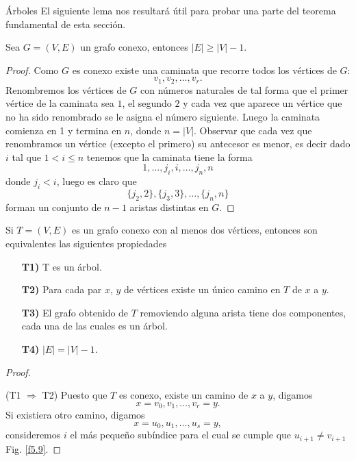 \begin{section}{Árboles}
El siguiente lema nos resultará útil para probar una parte del teorema fundamental de esta sección.

\begin{lema}\label{conv} Sea $G=(V,E)$ un grafo conexo, entonces $|E| \ge |V| -1$.  
\end{lema}
\begin{proof} Como $G$ es conexo existe una caminata que recorre todos los vértices de $G$:
$$
v_1,v_2,\ldots,v_r.
$$
Renombremos los vértices de $G$ con números naturales de tal forma que el primer vértice de la caminata sea $1$, el segundo $2$ y cada vez que aparece un vértice que no ha sido renombrado se le asigna el número siguiente. Luego la caminata comienza en 1 y termina en $n$, donde $n = |V|$.  Observar que cada vez que renombramos un vértice (excepto el primero) su antecesor es menor, es decir dado $i$ tal que $1 < i \le n$ tenemos que la caminata tiene la forma
$$
1,\ldots,j_i,i,\ldots,j_n,n
$$ 
donde $j_i < i$, luego es claro  que 
$$
\{j_{2},2\}, \{j_{3},3\}, \ldots, \{j_{n},n\}
$$
forman un conjunto de $n-1$ aristas distintas en $G$. 
\end{proof}

\begin{teorema}\label{t5.5} Si $T=(V,E)$ es un grafo conexo con al menos dos vértices, entonces son equivalentes las siguientes propiedades
\begin{enumerate}
\item[\textbf{T1)}] T es un árbol.
\item[\textbf{T2)}] \label{T2} Para cada par $x$, $y$ de vértices existe un único camino en $T$ de $x$ a
$y$.
\item[\textbf{T3)}] \label{T3} El grafo obtenido de $T$ removiendo alguna arista tiene dos
componentes, cada una de las cuales es un árbol.
\item[\textbf{T4)}] \label{T4} $|E|=|V|-1$.
\end{enumerate}
\end{teorema}
\begin{proof}
    \
    
\noindent (T1 $\Rightarrow$ T2) Puesto que $T$ es conexo, existe un
camino de $x$ a $y$, digamos
$$
x=v_0,v_1,\ldots,v_r=y.
$$
Si existiera otro camino, digamos
$$ x=u_0,u_1,\ldots,u_s=y,
$$
consideremos $i$ el más pequeño subíndice para el cual se cumple
que $u_{i+1}\not=v_{i+1}$ Fig. \ref{f5.9}.


\end{proof}
\end{section}
